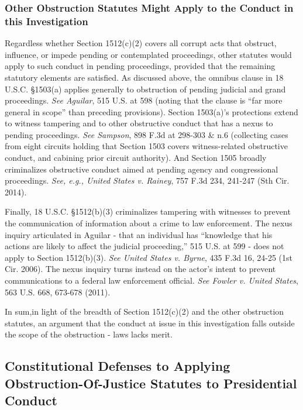 \subsubsection{Other Obstruction Statutes Might Apply to the Conduct in this Investigation}

Regardless whether Section 1512(c)(2) covers all corrupt acts that obstruct, influence, or impede pending or contemplated proceedings, other statutes would apply to such conduct in pending proceedings, provided that the remaining statutory elements are satisfied.
As discussed above, the omnibus clause in 18 U.S.C. \S 1503(a) applies generally to obstruction of pending judicial and grand proceedings.%
\textit{See Aguilar}, 515 U.S. at 598 (noting that the clause is “far more general in scope” than preceding provisions).
Section 1503(a)’s protections extend to witness tampering and to other obstructive conduct that has a nexus to pending proceedings.
\textit{See Sampson}, 898 F.3d at 298-303 \& n.6 (collecting cases from eight circuits holding that Section 1503 covers witness-related obstructive conduct, and cabining prior circuit authority).
And Section 1505 broadly criminalizes obstructive conduct aimed at pending agency and congressional proceedings.%
\textit{See, e.g., United States v. Rainey}, 757 F.3d 234, 241-247 (Sth Cir. 2014).

Finally, 18 U.S.C. \S 1512(b)(3) criminalizes tampering with witnesses to prevent the communication of information about a crime to law enforcement.
The nexus inquiry articulated in Aguilar - that an individual has “knowledge that his actions are likely to affect the judicial proceeding,” 515 U.S. at 599 - does not apply to Section 1512(b)(3).
\textit{See United States v. Byrne}, 435 F.3d 16, 24-25 (1st Cir. 2006).
The nexus inquiry turns instead on the actor’s intent to prevent communications to a federal law enforcement official.
\textit{See Fowler v. United States}, 563 U.S. 668, 673-678 (2011).

\hr

In sum,in light of the breadth of Section 1512(c)(2) and the other obstruction statutes, an argument that the conduct at issue in this investigation falls outside the scope of the obstruction - laws lacks merit.

\subsection{Constitutional Defenses to Applying Obstruction-Of-Justice Statutes to Presidential Conduct}

